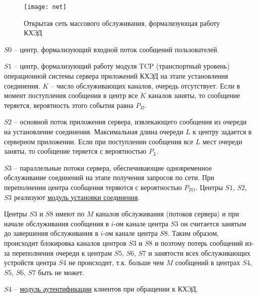 \begin{figure}[h]
  \centering
  \texttt{[image: net]}
  \caption{Открытая сеть массового обслуживания, формализующая работу КХЭД}
  \label{img:net}
\end{figure}

$S0$ -- центр, формализующий входной поток сообщений пользователей.

\vspace{\baselineskip}
$S1$ -- центр, формализующий работу модуля TCP (транспортный уровень) операционной системы сервера приложений КХЭД на этапе установления соединения. $K$ – число обслуживающих каналов, очередь отсутствует. Если в момент поступления сообщения в центр все $K$ каналов заняты, то сообщение теряется, вероятность этого события равна $P_B$.

\vspace{\baselineskip}
$S2$ -- основной поток приложения сервера, извлекающего сообщения из очереди на установление соединения. Максимальная длина очереди $L$ к центру задается в серверном приложении. Если при поступлении сообщения все $L$ мест очереди заняты, то сообщение теряется с вероятностью $P_L$.

\vspace{\baselineskip}
$S3$ -- параллельные потоки сервера, обеспечивающие одновременное обслуживание соединений на этапе получения запросов по сети. При переполнении центра сообщения теряются с вероятностью $P_{TO}$.
Центры $S1$, $S2$, $S3$ реализуют \underline{модуль установки соединения}.

\vspace{\baselineskip}
Центры $S3$ и $S8$ имеют по $M$ каналов обслуживания (потоков сервера) и при начале обслуживания сообщения в $i$-ом канале центра $S3$ он считается занятым до завершения обслуживания в $i$-ом канале центра $S8$. Таким образом, происходит блокировка каналов центров $S3$ и $S8$ и поэтому потерь сообщений из-за переполнения очереди к центрам $S5$, $S6$, $S7$ и занятости всех обслуживающих устройств центра $S4$ не происходит, т.к. больше чем $M$ сообщений в центрах $S4$, $S5$, $S6$, $S7$ быть не может.

\vspace{\baselineskip}
$S4$ -- \underline{модуль аутентификации} клиентов при обращении к КХЭД.

